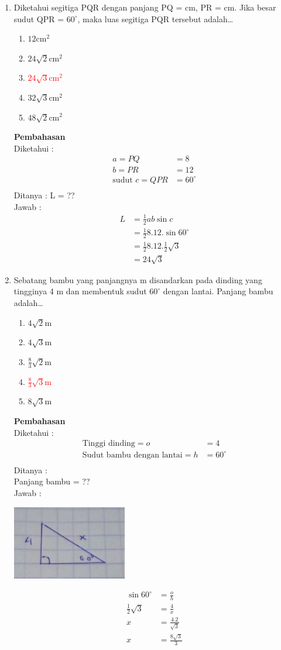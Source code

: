 \documentclass{report}
\newcommand{\options}[5]{
\begin{enumerate}[label=\alph*.]
	\item #1
	\item #2
	\item #3
	\item #4
	\item #5
\end{enumerate}
}
\newcommand{\pemb}{ \textbf{Pembahasan} \\}
\begin{document}
\begin{enumerate}
\item Diketahui segitiga PQR dengan panjang PQ = cm, PR = cm. Jika besar sudut QPR = $60^{\circ}$, maka luas segitiga PQR tersebut adalah\ldots
\options
{$12\text{cm}^2$}
{$24\sqrt{2}\text{cm}^2$}
{\textcolor{red}{$24\sqrt{3}\text{cm}^2$}}
{$32\sqrt{3}\text{cm}^2$}
{$48\sqrt{2}\text{cm}^2$}
\pemb
Diketahui :
\begin{align*}
	a = PQ &= 8 \\
	b = PR &= 12 \\
	\text{sudut } c = QPR &= 60^{\circ}\\
\end{align*}
Ditanya :
L = ?? \\
Jawab :
\begin{align*}
	L &= \frac{1}{2}ab\sin{c} \\
	   &= \frac{1}{2}8.12.\sin{60^{\circ}} \\
	   &= \frac{1}{2}8.12.\frac{1}{2}\sqrt{3} \\
	   &= 24\sqrt{3}
\end{align*}

\item Sebatang bambu yang panjangnya m disandarkan pada dinding yang tingginya 4 m dan membentuk sudut $60^{\circ}$ dengan lantai. Panjang bambu adalah\ldots
\options
{$4\sqrt{2}$m}
{$4\sqrt{3}$m}
{$\frac{8}{3}\sqrt{2}$m}
{\textcolor{red}{$\frac{8}{3}\sqrt{3}$m}}
{$8\sqrt{3}$m}
\pemb
Diketahui :
\begin{align*}
	\text{Tinggi dinding} = o &= 4\\
	\text{Sudut bambu dengan lantai} = h &= 60^{\circ}\\
\end{align*}
Ditanya : \\
Panjang bambu = ?? \\
Jawab : \\
\begin{center}
\includegraphics[valign=c,width=50mm,scale=0.5]{seg_19.jpg} \\
\end{center}
\begin{align*}
	\sin{60^{\circ}} &= \frac{o}{h} \\
	\frac{1}{2}\sqrt{3} &= \frac{4}{x} \\
	x &= \frac{4.2}{\sqrt{3}} \\
	x &= \frac{8\sqrt{3}}{3} \\
\end{align*}


\end{enumerate}
\end{document}
